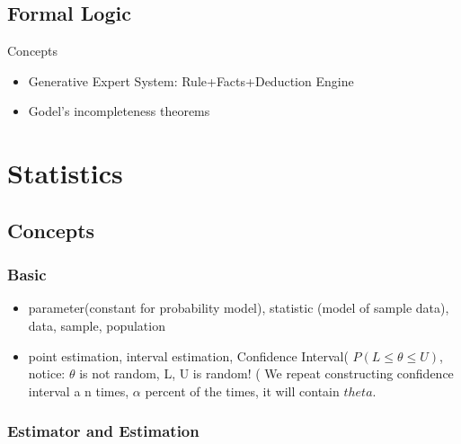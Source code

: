 \documentclass[11pt, openany]{book}              %
\begin{document}
\section{Formal Logic}

Concepts
\begin{itemize}
    \item Generative Expert System: Rule+Facts+Deduction Engine 
    \item Godel's incompleteness theorems
\end{itemize}

\chapter{Statistics}

\section{Concepts}
\subsection{Basic}
\begin{itemize}
    \item parameter(constant for probability model), statistic (model of sample data), data, sample, population
    \item point estimation, interval estimation, Confidence Interval( $P(L \leq \theta \leq U )$, notice: $\theta$ is not random, L, U is random! ( We repeat constructing confidence interval a n times, $\alpha$ percent of the times, it will contain $theta$.
\end{itemize}

\subsection{Estimator and Estimation}
\end{document}

